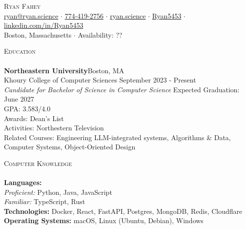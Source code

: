 \documentclass[a4paper, 10pt]{article}
\newcommand{\lineunder}{
    \vspace*{-8pt} \\
    \hspace*{-18pt} \hrulefill \\
}
\newcommand{\header}[1]{
    {\hspace*{-18pt}\vspace*{6pt} \textsc{#1}}
    \vspace*{-6pt} \lineunder
}
\begin{document}
\vspace*{-20pt}

\vspace*{-10pt}
\begin{center}
    {\Huge \scshape {Ryan Fahey}}\\
     \href{mailto:ryan@ryan.science}{ryan@ryan.science} $\cdot$   \href{tel:7744192756}{774-419-2756} $\cdot$  \href{https://ryan.science}{ryan.science} $\cdot$  \href{https://github.com/Ryan5453}{Ryan5453} $\cdot$  \href{https://www.linkedin.com/in/Ryan5453}{linkedin.com/in/Ryan5453}\\
    Boston, Massachusetts $\cdot$ Availability: ??\\
\end{center}


\header{Education}
\textbf{Northeastern University}\hfill Boston, MA\\
Khoury College of Computer Sciences \hfill September 2023 - Present\\
\textit{Candidate for Bachelor of Science in Computer Science} \hfill Expected Graduation: June 2027\\
GPA: 3.583/4.0\\
Awards: Dean's List\\
Activities: Northestern Television\\
Related Courses: Engineering LLM-integrated systems, Algorithms \& Data, Computer Systems, Object-Oriented Design\\
\vspace{2mm}


\header{Computer Knowledge}
\textbf{Languages:}\\
    \hspace{0.5cm}\textit{Proficient:} Python, Java, JavaScript\\
    \hspace{0.5cm}\textit{Familiar:} TypeScript, Rust\\
\textbf{Technologies:} Docker, React, FastAPI, Postgres, MongoDB, Redis, Cloudflare\\
\textbf{Operating Systems:} macOS, Linux (Ubuntu, Debian), Windows\\
\vspace{2mm}

\end{document}

